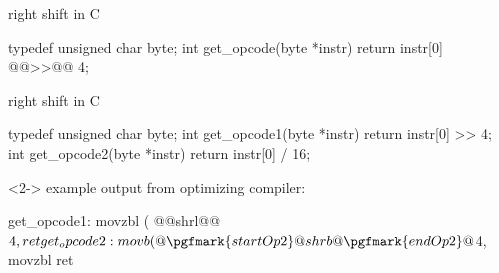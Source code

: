 \begin{frame}[fragile,label=shiftInC]{right shift in C}
\begin{ccodeNL}
typedef unsigned char byte;
int get_opcode(byte *instr) {
    return instr[0] @@>>@@ 4;
}
\end{ccodeNL}
\end{frame}

\begin{frame}[fragile,label=shiftInC2]{right shift in C}
\begin{ccodeS}
typedef unsigned char byte;
int get_opcode1(byte *instr) { return instr[0] >> 4; }
int get_opcode2(byte *instr) { return instr[0] / 16; }
\end{ccodeS}
\begin{visibleenv}<2->
example output from optimizing compiler:
\begin{asmcodeS}
get_opcode1:
    movzbl (%
   @@shrl@@$4, %
    ret

get_opcode2:
    movb (%
   @@shrb@@$4, %
    movzbl %
    ret
\end{asmcodeS}
\end{visibleenv}
\end{frame}


